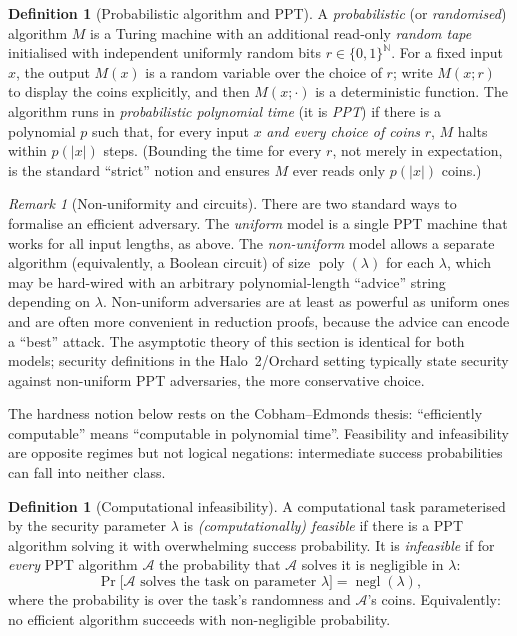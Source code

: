 \documentclass[11pt,a4paper]{article}
\theoremstyle{definition}
\newtheorem{definition}[theorem]{Definition}
\theoremstyle{remark}
\newtheorem{remark}[theorem]{Remark}
\DeclareMathOperator{\negl}{negl}
\DeclareMathOperator{\poly}{poly}
\providecommand{\abs}[1]{\lvert #1 \rvert}
\newcommand{\Adv}{\ensuremath{\mathcal{A}}}
\begin{document}
\begin{definition}[Probabilistic algorithm and PPT]
\label{probability:def-ppt}
A \emph{probabilistic} (or \emph{randomised}) algorithm \(M\) is a
Turing machine with an additional read-only \emph{random tape}
initialised with independent uniformly random bits
\(r \in \{0,1\}^{\mathbb N}\). For a fixed input \(x\), the output \(M(x)\) is
a random variable over the choice of \(r\); write \(M(x; r)\) to
display the coins explicitly, and then \(M(x; \cdot)\) is a
deterministic function. The algorithm runs in \emph{probabilistic
polynomial time} (it is \emph{PPT}) if there is a polynomial \(p\)
such that, for every input \(x\) \emph{and every choice of coins}
\(r\), \(M\) halts within \(p(\abs{x})\) steps. (Bounding the time
for every \(r\), not merely in expectation, is the standard
``strict'' notion and ensures \(M\) ever reads only \(p(\abs{x})\)
coins.)
\end{definition}

\begin{remark}[Non-uniformity and circuits]
\label{probability:rem-nonuniform}
There are two standard ways to formalise an efficient adversary. The
\emph{uniform} model is a single PPT machine that works for all input
lengths, as above. The \emph{non-uniform} model allows a separate
algorithm (equivalently, a Boolean circuit) of size
\(\poly(\lambda)\) for each \(\lambda\), which may be hard-wired with
an arbitrary polynomial-length ``advice'' string depending on
\(\lambda\). Non-uniform adversaries are at least as powerful as
uniform ones and are often more convenient in reduction proofs,
because the advice can encode a ``best'' attack. The asymptotic
theory of this section is identical for both models; security
definitions in the Halo~2/Orchard setting typically state security
against non-uniform PPT adversaries, the more conservative choice.
\end{remark}

The hardness notion below rests on the Cobham--Edmonds thesis:
``efficiently computable'' means ``computable in polynomial time''.
Feasibility and infeasibility are opposite regimes but not logical
negations: intermediate success probabilities can fall into neither
class.

\begin{definition}[Computational infeasibility]
\label{probability:def-infeasible}
A computational task parameterised by the security parameter
\(\lambda\) is \emph{(computationally) feasible} if there is a PPT
algorithm solving it with overwhelming success probability. It is
\emph{infeasible} if for \emph{every} PPT algorithm \(\Adv\) the
probability that \(\Adv\) solves it is negligible in \(\lambda\):
\[
\Pr\bigl[\Adv \text{ solves the task on parameter } \lambda\bigr]
= \negl(\lambda),
\]
where the probability is over the task's randomness and \(\Adv\)'s
coins. Equivalently: no efficient algorithm succeeds with
non-negligible probability.
\end{definition}
\end{document}
